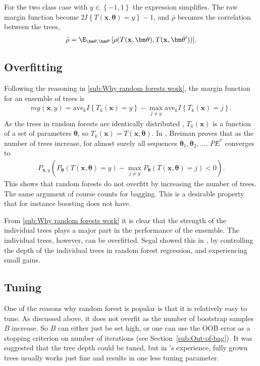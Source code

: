 For the two class case with $y \in \left\{ -1, 1 \right\}$ the expression simplifies. The raw margin function become $2 I\left\{ T(\mathbf{x}, \bm \theta) = y \right\} - 1$, and $\bar \rho$ becomes the correlation between the trees,
\begin{align}
  \bar \rho = \E_{\bm \theta, \bm \theta'}[\rho(T(\mathbf{x}, \bm \theta), T(\mathbf{x}, \bm \theta'))]. 
\end{align}



\subsection{Overfitting}
\label{sub:Overfitting}
Following the reasoning in \ref{sub:Why random forests work}, the margin function for an ensemble of trees is
\begin{align}
  mg(\mathbf{x}, y) = \mathrm{ave}_k I\left\{ T_k(\mathbf{x}) = y \right\} - 
  \max_{j \neq y} \mathrm{ave}_k I\left\{ T_k(\mathbf{x}) = j \right\}.
\end{align}
As the trees in random forests are identically distributed , $T_k(\mathbf{x})$ is a function of a set of parameters $\bm \theta$, so $T_k(\mathbf{x}) = T(\mathbf{x}, \bm \theta)$. In \cite{randomforests}, Breiman proves that as the number of trees increase, for almost surely all sequences $\bm \theta_1, \bm \theta_2, \ldots$, $PE^*$ converges to 
\begin{align}
  P_{\mathbf{x}, y} (P_{\bm \theta} (T(\mathbf{x}, \bm \theta) = y) - \max_{j \neq y} P_{\bm \theta}(T(\mathbf{x}, \bm \theta) = j) < 0).
\end{align}
This shows that random forests do not overfitt by increasing the number of trees. The same argument of course counts for bagging. This is a desirable property that for instance boosting does not have. 

From \ref{sub:Why random forests work} it is clear that the strength of the individual trees plays a major part in the performance of the ensemble. The individual trees, however, can be overfitted. Segal showed this in \cite{segal2004},  by controlling the depth of the individual trees in random forest regression, and experiencing small gains. 


\subsection{Tuning}
\label{sub:Tuning}
One of the reasons why random forest is popular is that it is relatively easy to tune. As discussed above, it does not overfit as the number of bootstrap samples $B$ increase. So $B$ can either just be set high, or one can use the OOB error as a stopping criterion on number of iterations (see Section~\ref{sub:Out-of-bag}). It was suggested that the tree depth could be tuned, but in \cite{modstat}'s experience, fully grown trees usually works just fine and results in one less tuning parameter. 

